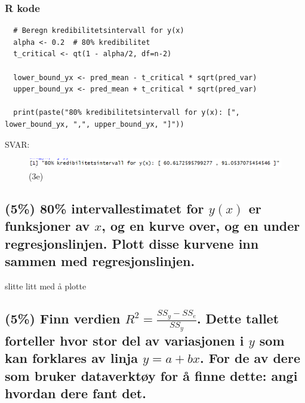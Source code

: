 \documentclass[12pt]{article}
\begin{document}
\subsubsection{R kode}
\begin{verbatim}
  # Beregn kredibilitetsintervall for y(x)
  alpha <- 0.2  # 80% kredibilitet
  t_critical <- qt(1 - alpha/2, df=n-2)
  
  lower_bound_yx <- pred_mean - t_critical * sqrt(pred_var)
  upper_bound_yx <- pred_mean + t_critical * sqrt(pred_var)
  
  print(paste("80% kredibilitetsintervall for y(x): [", lower_bound_yx, ",", upper_bound_yx, "]"))  
\end{verbatim}
SVAR:
\begin{figure}[H]
  \centering
  \includegraphics[width=1\textwidth]{3e.png}
  \caption{(3e)}
\end{figure}



\subsection{(5\%) 80\% intervallestimatet for $y(x)$ er funksjoner av $x$, og en kurve over, og en under regresjonslinjen. Plott disse kurvene inn sammen med regresjonslinjen.}
slitte litt med å plotte

\subsection{(5\%) Finn verdien $R^2 = \frac{SS_y - SS_e}{SS_y}$. Dette tallet forteller hvor stor del av variasjonen i $y$ som kan forklares av linja $y = a + bx$. For de av dere som bruker dataverktøy for å finne dette: angi hvordan dere fant det.}
\end{document}
